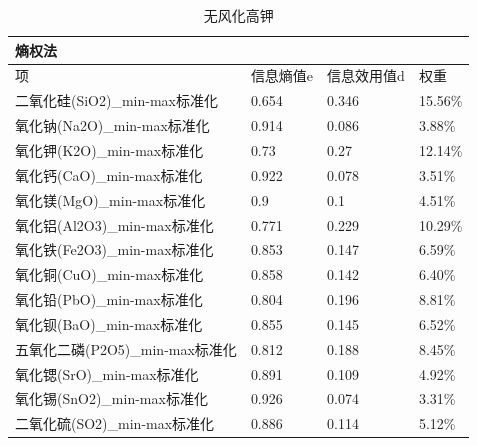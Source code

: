 \documentclass[UTF8]{ctexart}
\begin{document}
\begin{table}[H]
    \centering
    \caption{无风化高钾}
    \begin{tabular}{|l|l|l|l|}
        \hline
        熵权法                          & ~         & ~           & ~       \\ \hline
        项                              & 信息熵值e & 信息效用值d & 权重    \\ \hline
        二氧化硅(SiO2)\_min-max标准化   & 0.654     & 0.346       & 15.56\% \\ \hline
        氧化钠(Na2O)\_min-max标准化     & 0.914     & 0.086       & 3.88\%  \\ \hline
        氧化钾(K2O)\_min-max标准化      & 0.73      & 0.27        & 12.14\% \\ \hline
        氧化钙(CaO)\_min-max标准化      & 0.922     & 0.078       & 3.51\%  \\ \hline
        氧化镁(MgO)\_min-max标准化      & 0.9       & 0.1         & 4.51\%  \\ \hline
        氧化铝(Al2O3)\_min-max标准化    & 0.771     & 0.229       & 10.29\% \\ \hline
        氧化铁(Fe2O3)\_min-max标准化    & 0.853     & 0.147       & 6.59\%  \\ \hline
        氧化铜(CuO)\_min-max标准化      & 0.858     & 0.142       & 6.40\%  \\ \hline
        氧化铅(PbO)\_min-max标准化      & 0.804     & 0.196       & 8.81\%  \\ \hline
        氧化钡(BaO)\_min-max标准化      & 0.855     & 0.145       & 6.52\%  \\ \hline
        五氧化二磷(P2O5)\_min-max标准化 & 0.812     & 0.188       & 8.45\%  \\ \hline
        氧化锶(SrO)\_min-max标准化      & 0.891     & 0.109       & 4.92\%  \\ \hline
        氧化锡(SnO2)\_min-max标准化     & 0.926     & 0.074       & 3.31\%  \\ \hline
        二氧化硫(SO2)\_min-max标准化    & 0.886     & 0.114       & 5.12\%  \\ \hline
    \end{tabular}
\end{table}
\end{document}
